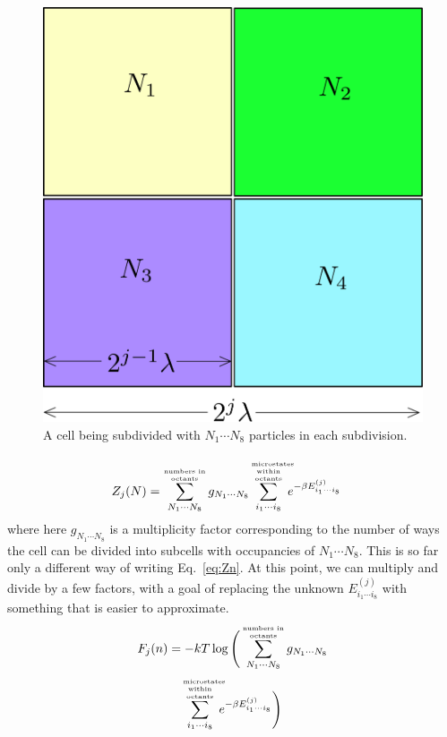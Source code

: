 \documentclass[letterpaper,twocolumn,amsmath,amssymb,pre,aps,10pt]{revtex4-1}
\begin{document}
\begin{figure}
  \centering
  \includegraphics[width=0.8\columnwidth]{figs/divisions}
  \caption{A cell being subdivided with $N_1\cdots N_8$ particles in
    each subdivision.}
\end{figure}
\newcommand\sumoccupanciesofoctants{
  \sum_{N_1\cdots N_8}^{\text{\tiny\begin{minipage}{5em}
      \begin{center}
      \tiny numbers in octants\end{center}\end{minipage}}}
}
\newcommand\summicrostatesofoctants{
  \sum_{i_1\cdots i_8}^{\text{\tiny\begin{minipage}{4em}
      \begin{center}
      \tiny microstates\\within octants\end{center}\end{minipage}}}
}
\begin{align}
  Z_j(N) &= \sumoccupanciesofoctants g_{N_1\cdots N_8}
       \summicrostatesofoctants
       e^{-\beta E_{i_1\cdots i_8}^{(j)}}
\end{align}
where here $g_{N_1\cdots N_8}$ is a multiplicity factor
corresponding to the number of ways the cell can be divided into
subcells with occupancies of $N_1\cdots N_8$.  This is so far only a
different way of writing Eq.~\ref{eq:Zn}.  At this point, we can
multiply and divide by a few factors, with a goal of replacing the
unknown $E_{i_1\cdots i_8}^{(j)}$ with something that is easier to
approximate.
\begin{multline}
  F_j(n) = -kT\log\Bigg(
    \sumoccupanciesofoctants
       g_{N_1\cdots N_8}
       \\
       \summicrostatesofoctants
       e^{-\beta E_{i_1\cdots i_8}^{(j)}}
  \Bigg)
\end{multline}
\end{document}
